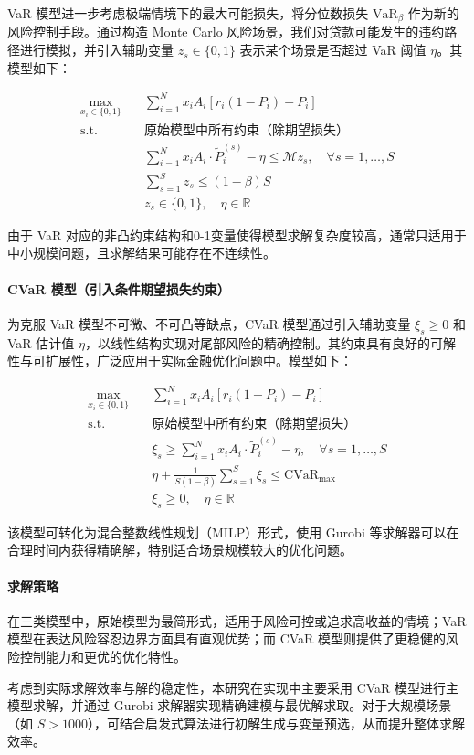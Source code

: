 \documentclass[nonblindrev]{write_paper}
\begin{document}
VaR 模型进一步考虑极端情境下的最大可能损失，将分位数损失 $\text{VaR}_\beta$ 作为新的风险控制手段。通过构造 Monte Carlo 风险场景，我们对贷款可能发生的违约路径进行模拟，并引入辅助变量 $z_s \in \{0,1\}$ 表示某个场景是否超过 VaR 阈值 $\eta$。其模型如下：

\begin{align*}
\max_{x_i \in \{0,1\}} \quad & \sum_{i=1}^N x_i A_i \left[ r_i(1 - P_i) - P_i \right] \\
\text{s.t.} \quad
& \text{原始模型中所有约束（除期望损失）} \\
& \sum_{i=1}^N x_i A_i \cdot \tilde{P}_i^{(s)} - \eta \le \mathcal{M} z_s, \quad \forall s = 1, \dots, S \\
& \sum_{s=1}^S z_s \le (1 - \beta) S \\
& z_s \in \{0,1\}, \quad \eta \in \mathbb{R}
\end{align*}

由于 VaR 对应的非凸约束结构和0-1变量使得模型求解复杂度较高，通常只适用于中小规模问题，且求解结果可能存在不连续性。

\vspace{1em}
\paragraph{CVaR 模型（引入条件期望损失约束）}

为克服 VaR 模型不可微、不可凸等缺点，CVaR 模型通过引入辅助变量 $\xi_s \ge 0$ 和 VaR 估计值 $\eta$，以线性结构实现对尾部风险的精确控制。其约束具有良好的可解性与可扩展性，广泛应用于实际金融优化问题中。模型如下：

\begin{align*}
\max_{x_i \in \{0,1\}} \quad & \sum_{i=1}^N x_i A_i \left[ r_i(1 - P_i) - P_i \right] \\
\text{s.t.} \quad
& \text{原始模型中所有约束（除期望损失）} \\
& \xi_s \ge \sum_{i=1}^N x_i A_i \cdot \tilde{P}_i^{(s)} - \eta, \quad \forall s = 1, \dots, S \\
& \eta + \frac{1}{S(1 - \beta)} \sum_{s=1}^S \xi_s \le \text{CVaR}_{\max} \\
& \xi_s \ge 0, \quad \eta \in \mathbb{R}
\end{align*}

该模型可转化为混合整数线性规划（MILP）形式，使用 Gurobi 等求解器可以在合理时间内获得精确解，特别适合场景规模较大的优化问题。

\vspace{1em}
\paragraph{求解策略}

在三类模型中，原始模型为最简形式，适用于风险可控或追求高收益的情境；VaR 模型在表达风险容忍边界方面具有直观优势；而 CVaR 模型则提供了更稳健的风险控制能力和更优的优化特性。

考虑到实际求解效率与解的稳定性，本研究在实现中主要采用 CVaR 模型进行主模型求解，并通过 Gurobi 求解器实现精确建模与最优解求取。对于大规模场景（如 $S > 1000$），可结合启发式算法进行初解生成与变量预选，从而提升整体求解效率。

\newpage
 

\end{document}
